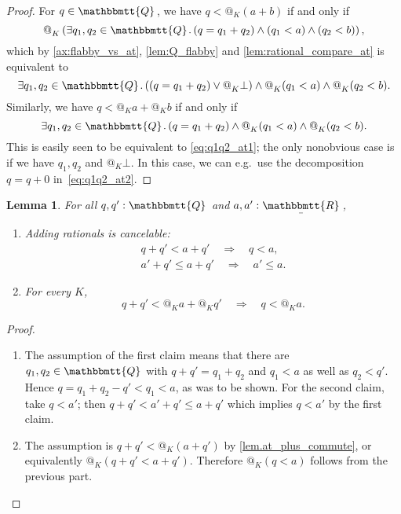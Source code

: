 \documentclass[11pt, oneside, article]{memoir}
\makeatletter
\theoremstyle{plain}
\newtheorem{lemma}[theorem]{Lemma}
\theoremstyle{definition}
\theoremstyle{remark}
\newcommand{\ubar}[1]{\underaccent{\bar}{#1}}
\newcommand{\internal}[1]{\raisebox{-.03ex}{$\mathbbmtt{#1}$}}
\newcommand{\hs}{\hspace{1.1pt}}
\newcommand{\tQQ}{\internal{Q}\hs}
\newcommand{\tRR}{\internal{R}\hs}
\newcommand{\tLR}{\ubar{\tRR}\hs}
\newcommand{\AtSymbol}{{@}}
\newcommand{\At}[2][]{\AtSymbol^{#1}_{#2}}
\makeatother
\begin{document}
\begin{proof}
	For $q\in\tQQ$, we have $q < \At{K}(a + b)$ if and only if
	\[
		\At{K}\left(\exists q_1, q_2\in\tQQ\ldotp (q = q_1 + q_2) \land (q_1 < a) \land (q_2 < b)\right),
	\]
	which by \cref{ax:flabby_vs_at}, \cref{lem:Q_flabby} and \cref{lem:rational_compare_at} is equivalent to
	\begin{equation}
		\label{eq:q1q2_at1}
		\exists q_1, q_2\in\tQQ\ldotp \left((q = q_1 + q_2) \lor \At{K} \bot\right) \land \At{K}(q_1 < a) \land \At{K}(q_2 < b).
	\end{equation}
	Similarly, we have $q < \At{K} a + \At{K} b$ if and only if
	\begin{equation}
		\label{eq:q1q2_at2}
		\exists q_1, q_2 \in \tQQ \ldotp (q = q_1 + q_2) \land \At{K}(q_1 < a) \land \At{K}(q_2 < b).
	\end{equation}
	This is easily seen to be equivalent to \eqref{eq:q1q2_at1}; the only nonobvious case is if we have $q_1, q_2$ and $\At{K} \bot$. In this case, we can e.g.~use the decomposition $q = q + 0$ in~\eqref{eq:q1q2_at2}.
\end{proof}

\begin{lemma}
	\label{lem:subtract_q}
	For all $q,q':\tQQ$ and $a,a' : \tLR$,
	\begin{enumerate}
	\item Adding rationals is \emph{cancelable}:
		\begin{gather*}
			q + q' < a + q' \quad \Longrightarrow \quad q < a,\\
			a' + q' \leq a + q'\quad\Longrightarrow\quad a'\leq a.
		\end{gather*}
	\item For every $K$,
		\begin{equation}
			\label{eq.cancel_at_q'}
			q + q' < \At{K} a + \At{K} q' \quad \Longrightarrow \quad q < \At{K} a.
		\end{equation}
	\end{enumerate}
\end{lemma}

\begin{proof}
	\begin{enumerate}
		\item The assumption of the first claim means that there are $q_1,q_2\in\tQQ$ with $q + q' = q_1 + q_2$ and $q_1 < a$ as well as $q_2 < q'$. Hence $q = q_1 + q_2 - q' < q_1 < a$, as was to be shown. For the second claim, take $q<a'$; then $q+q'<a'+q'\leq a+q'$ which implies $q<a'$ by the first claim.
		\item The assumption is $q + q' < \At{K}(a + q')$ by \cref{lem.at_plus_commute}, or equivalently $\At{K}(q + q' < a + q')$. Therefore $\At{K}(q < a)$ follows from the previous part. \qedhere
	\end{enumerate}
\end{proof}
\end{document}
